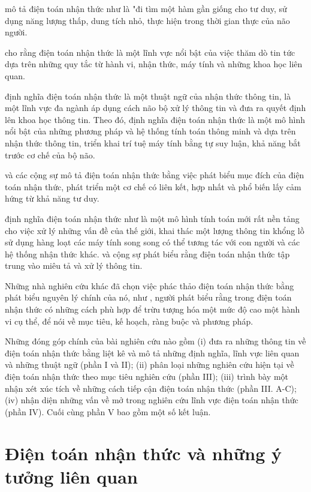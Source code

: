 \documentclass{article}
\begin{document}
 mô tả điện toán nhận thức như là "đi tìm một hàm gần giống cho tư duy, sử dụng năng lượng thấp, dung tích nhỏ, thực hiện trong thời gian thực của não người.

 cho rằng điện toán nhận thức là một lĩnh vực nổi bật của việc thăm dò tin tức dựa trên những quy tắc từ hành vi, nhận thức, máy tính và những khoa học liên quan.

 định nghĩa điện toán nhận thức là một thuật ngữ của nhận thức thông tin, là một lĩnh vực đa ngành áp dụng cách não bộ xử lý thông tin và đưa ra quyết định lên khoa học thông tin. Theo đó,  định nghĩa điện toán nhận thức là một mô hình nổi bật của những phương pháp và hệ thống tính toán thông minh và dựa trên nhận thức thông tin, triển khai trí tuệ máy tính bằng tự suy luận, khả năng bắt trước cơ chế của bộ não.

 và các cộng sự mô tả điện toán nhận thức bằng việc phát biểu mục đích của điện toán nhận thức, phát triển một cơ chế có liên kết, hợp nhất và phổ biến lấy cảm hứng từ khả năng tư duy.

 định nghĩa điện toán nhận thức như là một mô hình tính toán mới rất nền tảng cho việc xử lý những vấn đề của thế giới, khai thác một lượng thông tin khổng lồ sử dụng hàng loạt các máy tính song song có thể tương tác với con người và các hệ thống nhận thức khác.  và cộng sự phát biểu rằng điện toán nhận thức tập trung vào miêu tả và xử lý thông tin.

Những nhà nghiên cứu khác đã chọn việc phác thảo điện toán nhận thức bằng phát biểu nguyên lý chính của nó, như , người phát biểu rằng trong điện toán nhận thức có những cách phù hợp để trừu tượng hóa một mức độ cao một hành vi cụ thể, để nói về mục tiêu, kế hoạch, ràng buộc và phương pháp.

Những đóng góp chính của bài nghiên cứu nào gồm
(i) đưa ra những thông tin về điện toán nhận thức bằng liệt kê và mô tả những định nghĩa, lĩnh vực liên quan và những thuật ngữ (phần I và II); (ii) phân loại những nghiên cứu hiện tại về điện toán nhận thức theo mục tiêu nghiên cứu (phần III); (iii) trình bày một nhận xét xúc tích về những cách tiếp cận điện toán nhận thức (phần III. A-C); (iv) nhận diện những vấn về mở trong nghiên cứu lĩnh vực điện toán nhận thức (phần IV). Cuối cùng phần V bao gồm một số kết luận.

\section{Điện toán nhận thức và những ý tưởng liên quan} \label{sec:2-related-concepts}
\end{document}
